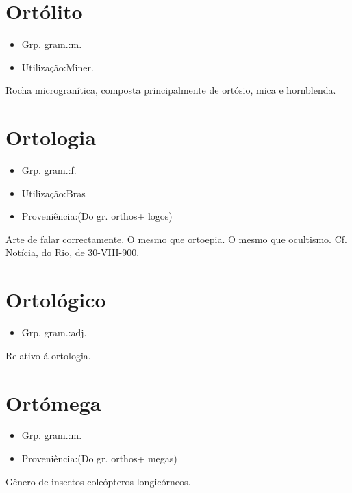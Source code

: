 \section{Ortólito}
\begin{itemize}
\item {Grp. gram.:m.}
\end{itemize}
\begin{itemize}
\item {Utilização:Miner.}
\end{itemize}
Rocha microgranítica, composta principalmente de ortósio, mica e hornblenda.
\section{Ortologia}
\begin{itemize}
\item {Grp. gram.:f.}
\end{itemize}
\begin{itemize}
\item {Utilização:Bras}
\end{itemize}
\begin{itemize}
\item {Proveniência:(Do gr. \textunderscore orthos\textunderscore  + \textunderscore logos\textunderscore )}
\end{itemize}
Arte de falar correctamente.
O mesmo que \textunderscore ortoepia\textunderscore .
O mesmo que \textunderscore ocultismo\textunderscore . Cf. \textunderscore Notícia\textunderscore , do Rio, de 30-VIII-900.
\section{Ortológico}
\begin{itemize}
\item {Grp. gram.:adj.}
\end{itemize}
Relativo á ortologia.
\section{Ortómega}
\begin{itemize}
\item {Grp. gram.:m.}
\end{itemize}
\begin{itemize}
\item {Proveniência:(Do gr. \textunderscore orthos\textunderscore  + \textunderscore megas\textunderscore )}
\end{itemize}
Gênero de insectos coleópteros longicórneos.
